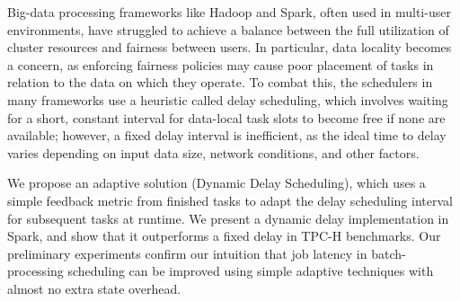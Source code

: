 Big-data processing frameworks like Hadoop and Spark, often used in multi-user environments, 
have struggled to achieve a balance between the full utilization of cluster resources and fairness between users. 
In particular, data locality becomes a concern, as enforcing fairness policies may cause poor placement of tasks in relation to the data on which they operate. 
To combat this, the schedulers in many frameworks use a heuristic called delay scheduling, 
which involves waiting for a short, constant interval for data-local task slots to become free if none are available; 
however, a fixed delay interval is inefficient, as the ideal time to delay varies depending on input data size, network conditions, and other factors.

We propose an adaptive solution (Dynamic Delay Scheduling), which uses a simple feedback metric from finished tasks to adapt the delay scheduling interval for 
subsequent tasks at runtime. We present a dynamic delay implementation in Spark, and show that it outperforms a fixed delay in TPC-H benchmarks. 
Our preliminary experiments confirm our intuition that job latency in batch-processing scheduling can be improved
using simple adaptive techniques with almost no extra state overhead.
